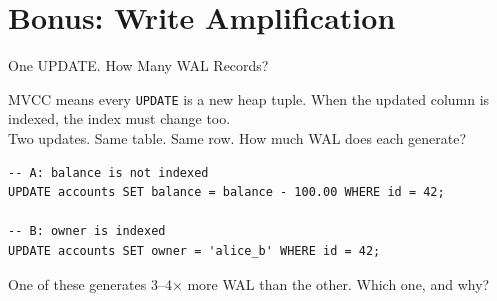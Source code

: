 \documentclass[aspectratio=169,10pt]{beamer}
\begin{document}
\section{Bonus: Write Amplification}

\begin{frame}[fragile]{One UPDATE. How Many WAL Records?}

  \begin{block}{}
    MVCC means every \texttt{UPDATE} is a new heap tuple.
    When the updated column is indexed, the index must change too.\\[0.4em]
    Two updates. Same table. Same row. How much WAL does each generate?
  \end{block}

  \vspace{0.5em}
\begin{lstlisting}[style=ascii]
-- A: balance is not indexed
UPDATE accounts SET balance = balance - 100.00 WHERE id = 42;

-- B: owner is indexed
UPDATE accounts SET owner = 'alice_b' WHERE id = 42;
\end{lstlisting}

  \vspace{0.5em}
  {\small One of these generates 3--4$\times$ more WAL than the other.
  Which one, and why?}

\end{frame}
\end{document}
